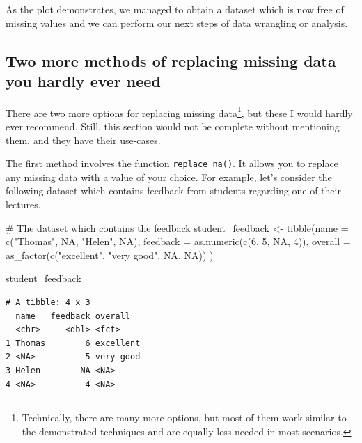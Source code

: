 \documentclass[
  letterpaper,
]{krantz}
\makeatletter
\newenvironment{Shaded}{\begin{snugshade}}{\end{snugshade}}
\newcommand{\AttributeTok}[1]{\textcolor[rgb]{0.40,0.45,0.13}{#1}}
\newcommand{\CommentTok}[1]{\textcolor[rgb]{0.37,0.37,0.37}{#1}}
\newcommand{\ConstantTok}[1]{\textcolor[rgb]{0.56,0.35,0.01}{#1}}
\newcommand{\DecValTok}[1]{\textcolor[rgb]{0.68,0.00,0.00}{#1}}
\newcommand{\FunctionTok}[1]{\textcolor[rgb]{0.28,0.35,0.67}{#1}}
\newcommand{\NormalTok}[1]{\textcolor[rgb]{0.00,0.23,0.31}{#1}}
\newcommand{\OtherTok}[1]{\textcolor[rgb]{0.00,0.23,0.31}{#1}}
\newcommand{\StringTok}[1]{\textcolor[rgb]{0.13,0.47,0.30}{#1}}
\newenvironment{kframe}{%
\medskip{}
\setlength{\fboxsep}{.8em}
 \def\at@end@of@kframe{}%
 \ifinner\ifhmode%
  \def\at@end@of@kframe{\end{minipage}}%
  \begin{minipage}{\columnwidth}%
 \fi\fi%
 \def\FrameCommand##1{\hskip\@totalleftmargin \hskip-\fboxsep
 \colorbox{shadecolor}{##1}\hskip-\fboxsep
     \hskip-\linewidth \hskip-\@totalleftmargin \hskip\columnwidth}%
 \MakeFramed {\advance\hsize-\width
   \@totalleftmargin\z@ \linewidth\hsize
   \@setminipage}}%
 {\par\unskip\endMakeFramed%
 \at@end@of@kframe}
\renewenvironment{Shaded}{\begin{kframe}}{\end{kframe}}
\makeatother
\begin{document}
As the plot demonstrates, we managed to obtain a dataset which is now
free of missing values and we can perform our next steps of data
wrangling or analysis.

\subsection{Two more methods of replacing missing data you hardly ever
need}\label{sec-two-more-methods-of-replacing-missing-data}

There are two more options for replacing missing data\footnote{Technically,
  there are many more options, but most of them work similar to the
  demonstrated techniques and are equally less needed in most scenarios.},
but these I would hardly ever recommend. Still, this section would not
be complete without mentioning them, and they have their use-cases.

The first method involves the function \texttt{replace\_na()}. It allows
you to replace any missing data with a value of your choice. For
example, let's consider the following dataset which contains feedback
from students regarding one of their lectures.

\begin{Shaded}
\begin{Highlighting}[]
\CommentTok{\# The dataset which contains the feedback}
\NormalTok{student\_feedback }\OtherTok{\textless{}{-}} \FunctionTok{tibble}\NormalTok{(}\AttributeTok{name =} \FunctionTok{c}\NormalTok{(}\StringTok{"Thomas"}\NormalTok{, }\ConstantTok{NA}\NormalTok{, }\StringTok{"Helen"}\NormalTok{, }\ConstantTok{NA}\NormalTok{),}
                           \AttributeTok{feedback =} \FunctionTok{as.numeric}\NormalTok{(}\FunctionTok{c}\NormalTok{(}\DecValTok{6}\NormalTok{, }\DecValTok{5}\NormalTok{, }\ConstantTok{NA}\NormalTok{, }\DecValTok{4}\NormalTok{)),}
                           \AttributeTok{overall =} \FunctionTok{as\_factor}\NormalTok{(}\FunctionTok{c}\NormalTok{(}\StringTok{"excellent"}\NormalTok{, }\StringTok{"very good"}\NormalTok{, }\ConstantTok{NA}\NormalTok{, }\ConstantTok{NA}\NormalTok{))}
\NormalTok{                           )}

\NormalTok{student\_feedback}
\end{Highlighting}
\end{Shaded}

\begin{verbatim}
# A tibble: 4 x 3
  name   feedback overall  
  <chr>     <dbl> <fct>    
1 Thomas        6 excellent
2 <NA>          5 very good
3 Helen        NA <NA>     
4 <NA>          4 <NA>     
\end{verbatim}
\end{document}
